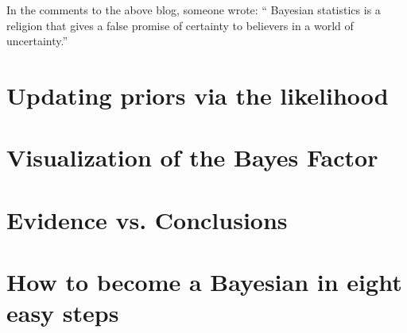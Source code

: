 In the comments to the above blog, someone wrote:
`` Bayesian statistics is a religion that gives a false promise of certainty to believers in a world of uncertainty.''

\section{Updating priors via the likelihood}
\label{sec:Updatingpriorsviathelikelihood}




\section{Visualization of the Bayes Factor}
\label{sec:VisualizationoftheBayesFactor}



\section{Evidence vs. Conclusions}
\label{sec:Evidencevs.Conclusions}



\section{How to become a Bayesian in eight easy steps}
\label{sec:HowtobecomeaBayesianineighteasysteps}




